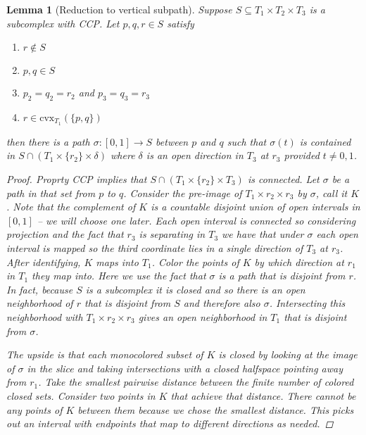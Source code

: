 \documentclass{article}
\theoremstyle{mystyle}
\newtheorem{lem}{Lemma}[section]
\theoremstyle{remark}
\begin{document}
\begin{lem}
    [Reduction to vertical subpath]
    \label{lem:verticalsubpath} 
    Suppose \(S \subseteq T_{1} \times T_{2} \times T_{3} \) is a subcomplex with CCP. Let \(p,q,r \in S\) satisfy
    \begin{enumerate}
        \item \(r \not\in S\) 
        \item \(p,q \in S\) 
        \item \(p_{2} = q_{2} = r_{2}\) and \(p_{3} = q_{3} =r_{3}\)
        \item \(r \in \text{cvx}_{T_{1}} (\{p,q\}) \) 
    \end{enumerate}
    then there is a path \(\sigma: [0,1] \to S\) between \(p\) and \(q\) such that \(\sigma(t)\) is contained in \(S \cap (T_{1} \times \{r_{2}\} \times \delta)\) where \(\delta\) is an open direction in \(T_{3}\) at \(r_{3}\) provided \(t \neq 0,1\).

    \begin{proof}
        Proprty CCP implies that \(S \cap (T_{1} \times \{r_{2}\} \times T_{3} )\) is connected. Let \(\sigma\) be a path in that set from \(p\) to \(q\). Consider the pre-image of \(T_{1} \times r_{2} \times r_{3}\) by \(\sigma\), call it \(K\). Note that the complement of \(K\) is a countable disjoint union of open intervals in \([0,1]\) -- we will choose one later. Each open interval is connected so considering projection and the fact that \(r_{3}\) is separating in \(T_{3}\) we have that under \(\sigma\) each open interval is mapped so the third coordinate lies in a single direction of \(T_{3}\) at \(r_{3}\). After identifying, \(K\) maps into \(T_{1}\). Color the points of \(K\) by which direction at \(r_1\) in \(T_{1}\) they map into. Here we use the fact that \(\sigma\) is a path that is disjoint from \(r\). In fact, because \(S\) is a subcomplex it is closed and so there is an open neighborhood of \(r\) that is disjoint from \(S\) and therefore also  \(\sigma\). Intersecting this neighborhood with \(T_{1} \times r_{2} \times r_{3}\) gives an open neighborhood in \(T_{1}\) that is disjoint from \(\sigma\). 

        The upside is that each monocolored subset of \(K\) is closed by looking at the image of \(\sigma\) in the slice and taking intersections with a closed halfspace pointing away from \(r_{1}\). Take the smallest pairwise distance between the finite number of colored closed sets. Consider two points in \(K\) that achieve that distance. There cannot be any points of \(K\) between them because we chose the smallest distance. This picks out an interval with endpoints that map to different directions as needed.
     \end{proof}
 

\end{lem}
\end{document}
